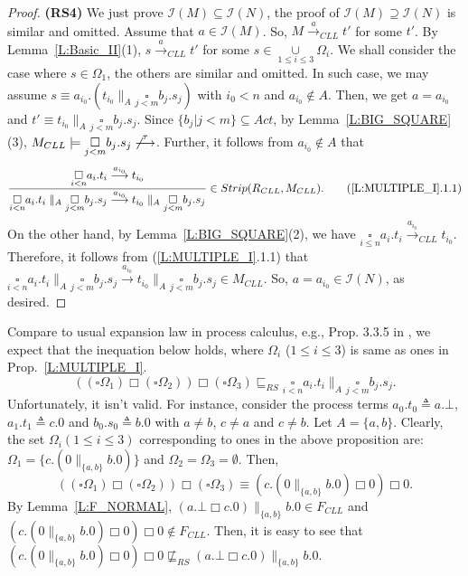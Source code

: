 \documentclass{elsarticle}
\theoremstyle{plain}
\theoremstyle{definition}
\begin{document}
\begin{proof}
  \textbf{(RS4)} We just prove ${\mathcal I}( M) \subseteq{\mathcal I}(N)$, the proof of ${\mathcal I}(M) \supseteq{\mathcal I}(N)$ is similar and omitted.
   Assume that $a \in {\mathcal I}(M)$.
   So, $ M \stackrel{a}{\longrightarrow}_{CLL} t'$ for some $t'$.
   By Lemma~\ref{L:Basic_II}(1), $s \stackrel{a}{\longrightarrow}_{CLL}t'$ for some $s \in \underset{1 \leq i \leq 3}\cup \Omega_i$.
     We shall consider the case where $s\in \Omega_1$, the others are similar and omitted.
     In such case, we may assume $s \equiv a_{i_0}.(t_{i_0}\parallel_A \underset{j<m}{\square}b_j.s_j)$ with $i_0<n$ and $a_{i_0}\notin A$.
     Then, we get $a = a_{i_0}$ and $t' \equiv t_{i_0}\parallel_A \underset{j<m}{\square}b_j.s_j$.
   Since $\{b_j|j<m\}\subseteq Act$, by Lemma~\ref{L:BIG_SQUARE}(3), $M_{CLL}\models \underset{j< m}{\square}b_j.s_j \not\stackrel{\tau}{\longrightarrow}$.
   Further, it follows from $a_{i_0}\notin A$ that
   \[ \frac{\underset{i< n}{\square}a_i.t_i \stackrel{a_{i_0}}{\longrightarrow} t_{i_0}}{\underset{i< n}{\square}a_i.t_i \parallel_A \underset{j< m}{\square}b_j.s_j \stackrel{a_{i_0}}{\longrightarrow} t_{i_0}\parallel_A \underset{j< m}{\square}b_j.s_j }\in Strip(R_{CLL},M_{CLL}).\tag{\ref{L:MULTIPLE_I}.1.1}\]
   On the other hand, by Lemma~\ref{L:BIG_SQUARE}(2), we have $\underset{i\leq n}{\square}a_i.t_i \stackrel{a_{i_0}}{\longrightarrow}_{CLL} t_{i_0}$.
    Therefore, it follows from (\ref{L:MULTIPLE_I}.1.1) that $\underset{i< n}{\square}a_i.t_i \parallel_A \underset{j< m}{\square}b_j.s_j \stackrel{a_{i_0}}{\longrightarrow} t_{i_0}\parallel_A \underset{j< m}{\square}b_j.s_j \in M_{CLL}$.
    So, $a = a_{i_0} \in {\mathcal I}(N)$, as desired.
\end{proof}

Compare to usual expansion law in process calculus, e.g., Prop. 3.3.5 in \cite{Milner89}, we expect that the inequation below holds, where $\Omega_i$ ($1\leq i\leq 3$) is same as ones in Prop.~\ref{L:MULTIPLE_I}.
\[((\square \Omega_1) \Box (\square \Omega_2)) \Box (\square \Omega_3) \sqsubseteq_{RS}    \underset{i< n}{\square}a_i.t_i \parallel_A \underset{j< m}{\square}b_j.s_j. \tag{EXP}\]
Unfortunately, it isn't valid.
For instance, consider the process terms $a_0.t_0 \triangleq a.\bot$, $a_1.t_1 \triangleq c.0$ and $b_0.s_0 \triangleq b.0$ with $a\neq b$, $c\neq a$ and $c \neq b$.
Let $A = \{a,b\}$.
Clearly, the set $\Omega_i(1 \leq i \leq 3)$ corresponding to ones in the above proposition are: $\Omega_1 =\{c.(0\parallel_{\{a,b\}}b.0)\}$ and $\Omega_2 = \Omega_3 = \emptyset$.
Then, \[(( \square \Omega_1) \Box (\square \Omega_2)) \Box ( \square \Omega_3 ) \equiv (c.(0 \parallel_{\{a,b\}} b.0)\Box 0)\Box 0.\]
By Lemma~\ref{L:F_NORMAL}, $(a.\bot \Box c.0) \parallel_{\{a,b\}} b.0 \in F_{CLL}$ and  $(c.(0\parallel_{\{a,b\}}b.0) \Box 0)\Box 0 \notin F_{CLL}$.
Then, it is easy to see that $(c.(0\parallel_{\{a,b\}}b.0) \Box 0)\Box 0 \not \sqsubseteq_{RS} (a.\bot \Box c.0) \parallel_{\{a,b\}} b.0 $.
\end{document}
